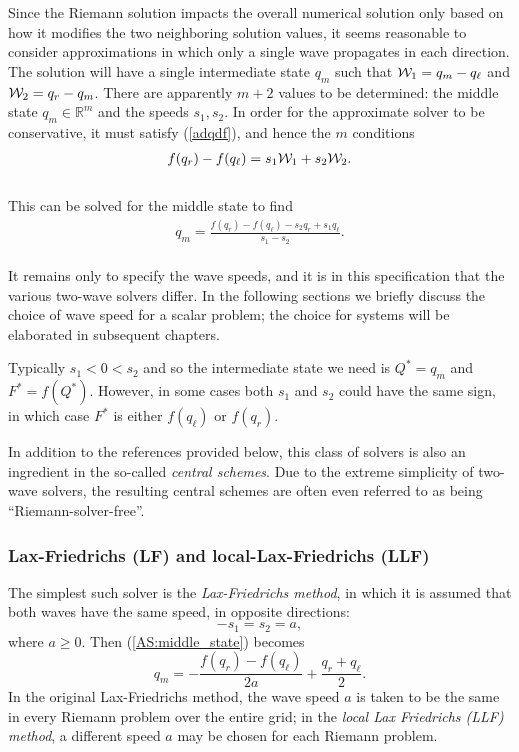 \documentclass[11pt]{article}
\begin{document}
Since the Riemann solution impacts the overall numerical solution only
based on how it modifies the two neighboring solution values, it seems
reasonable to consider approximations in which only a single wave
propagates in each direction. The solution will have a single
intermediate state \(q_m\) such that \({\cal W}_1 = q_m - q_\ell\) and
\({\cal W}_2 = q_r-q_m\). There are apparently \(m+2\) values to be
determined: the middle state \(q_m \in {\mathbb R}^m\) and the speeds
\(s_1, s_2\). In order for the approximate solver to be conservative, it
must satisfy (\ref{adqdf}), and hence the \(m\) conditions\\
\begin{align}
f(q_r) - f(q_\ell) = s_1 {\cal W}_1 + s_2 {\cal W}_2.
\end{align}\\
This can be solved for the middle state to find\\
\begin{align}  \label{AS:middle_state}
q_m = \frac{f(q_r) - f(q_\ell) - s_2 q_r + s_1 q_\ell}{s_1 - s_2}.
\end{align}\\
It remains only to specify the wave speeds, and it is in this
specification that the various two-wave solvers differ. In the following
sections we briefly discuss the choice of wave speed for a scalar
problem; the choice for systems will be elaborated in subsequent
chapters.

Typically \(s_1 < 0 < s_2\) and so the intermediate state we need is
\(Q^* = q_m\) and \(F^* = f(Q^*)\). However, in some cases both \(s_1\)
and \(s_2\) could have the same sign, in which case \(F^*\) is either
\(f(q_\ell)\) or \(f(q_r)\).

In addition to the references provided below, this class of solvers is
also an ingredient in the so-called \emph{central schemes}. Due to the
extreme simplicity of two-wave solvers, the resulting central schemes
are often even referred to as being ``Riemann-solver-free''.

    \hypertarget{lax-friedrichs-lf-and-local-lax-friedrichs-llf}{%
\subsubsection{Lax-Friedrichs (LF) and local-Lax-Friedrichs
(LLF)}\label{lax-friedrichs-lf-and-local-lax-friedrichs-llf}}

    The simplest such solver is the \emph{Lax-Friedrichs method}, in which
it is assumed that both waves have the same speed, in opposite
directions: \[-s_1 = s_2 = a,\] where \(a\ge 0\). Then
(\ref{AS:middle_state}) becomes
\[q_m = -\frac{f(q_r) - f(q_\ell)}{2a} + \frac{q_r + q_\ell}{2}.\] In
the original Lax-Friedrichs method, the wave speed \(a\) is taken to be
the same in every Riemann problem over the entire grid; in the
\emph{local Lax Friedrichs (LLF) method}, a different speed \(a\) may be
chosen for each Riemann problem.
\end{document}
